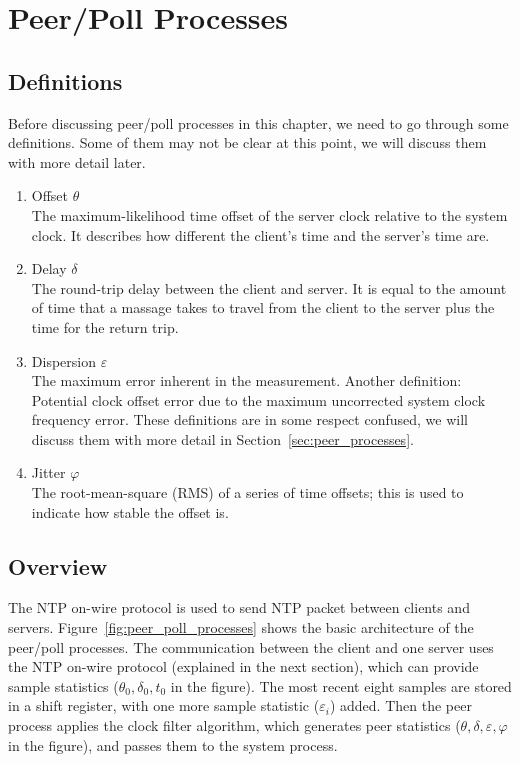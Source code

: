 \chapter{Peer/Poll Processes}
\label{cha:peer/poll_processes}

\section{Definitions}%
\label{sec:peer/poll_concepts}
Before discussing peer/poll processes in this chapter, we need to go through
some definitions. Some of them may not be clear at this point, we will discuss
them with more detail later.
\begin{enumerate}
    \item Offset $\theta$\\
        The maximum-likelihood time offset of the server clock relative to the
        system clock. It describes how different the client's time
        and the server's time are.
    \item Delay $\delta$\\
        The round-trip delay between the client and server. It is equal to the
        amount of time that a massage takes to travel from the client to the
        server plus the time for the return trip.
    \item Dispersion $\varepsilon$\\
        The maximum error inherent in the measurement.
        Another definition: Potential clock offset error due to the maximum
        uncorrected system clock frequency error.  These definitions are in
        some respect confused, we will discuss them with more detail in
        Section~\ref{sec:peer_processes}.
    \item Jitter $\varphi$\\
        The root-mean-square (RMS) of a series of time offsets; this is used to
        indicate how stable the offset is.
\end{enumerate}

\section{Overview}%
\label{sec:peer_poll_overview}
The NTP on-wire protocol is used to send NTP packet between clients and servers.
Figure~\ref{fig:peer_poll_processes} shows the basic architecture of the
peer/poll processes. The communication between the client and one server uses
the NTP on-wire protocol (explained in the next section), which can provide
sample statistics ($\theta_0, \delta_0, t_0$ in the figure).  The most recent
eight samples are stored in a shift register, with one more sample statistic
($\varepsilon_i$) added. Then the peer process applies the clock filter
algorithm, which generates peer statistics ($\theta, \delta, \varepsilon,
\varphi$ in the figure), and passes them to the system process.

